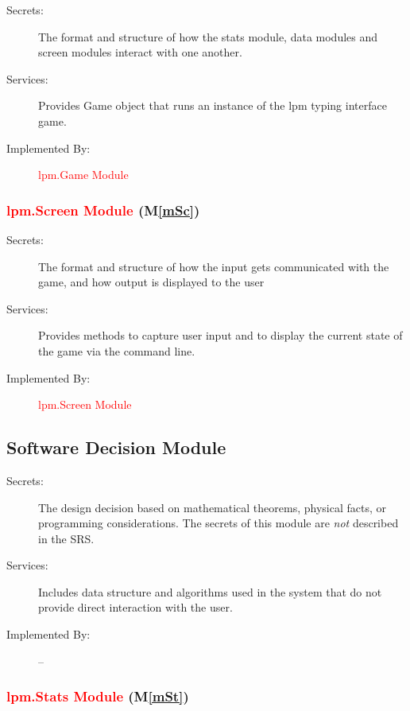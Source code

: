 \documentclass[12pt, titlepage]{article}
\newcommand{\mref}[1]{M\ref{#1}}
\begin{document}
\begin{description}
\item[Secrets:]The format and structure of how the stats module, data modules and screen modules interact with one another.
\item[Services:] Provides Game object that runs an instance of the lpm typing interface game.
\item[Implemented By:] \textcolor{red}{lpm.Game Module}
\end{description}

\subsubsection{\textcolor{red}{lpm.Screen Module} (\mref{mSc})}

\begin{description}
\item[Secrets:]The format and structure of how the input gets communicated with the game, and how output is displayed to the user
\item[Services:] Provides methods to capture user input and to display the current state of the game via the command line.
\item[Implemented By:] \textcolor{red}{lpm.Screen Module}
\end{description}

\subsection{Software Decision Module}

\begin{description}
\item[Secrets:] The design decision based on mathematical theorems, physical
  facts, or programming considerations. The secrets of this module are
  \emph{not} described in the SRS.
\item[Services:] Includes data structure and algorithms used in the system that
  do not provide direct interaction with the user.
\item[Implemented By:] --
\end{description}

\subsubsection{\textcolor{red}{lpm.Stats Module} (\mref{mSt})}
\end{document}
